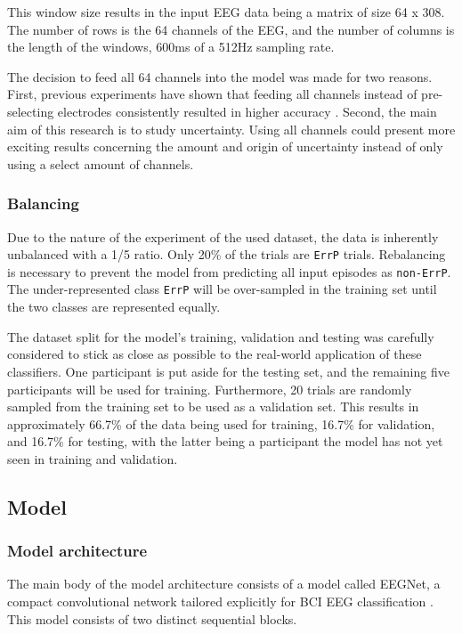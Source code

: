 This window size results in the input EEG data being a matrix of size 64 x 308. The number of rows is the 64 channels of the EEG, and the number of columns is the length of the windows, 600ms of a 512Hz sampling rate.

The decision to feed all 64 channels into the model was made for two reasons. First, previous experiments have shown that feeding all channels instead of pre-selecting electrodes consistently resulted in higher accuracy \citep{correia2021error}. Second, the main aim of this research is to study uncertainty. Using all channels could present more exciting results concerning the amount and origin of uncertainty instead of only using a select amount of channels.

\subsubsection{Balancing}

Due to the nature of the experiment of the used dataset, the data is inherently unbalanced with a 1/5 ratio. Only 20\% of the trials are \verb|ErrP| trials. Rebalancing is necessary to prevent the model from predicting all input episodes as \verb|non-ErrP|. The under-represented class \verb|ErrP| will be over-sampled in the training set until the two classes are represented equally.

The dataset split for the model's training, validation and testing was carefully considered to stick as close as possible to the real-world application of these classifiers. One participant is put aside for the testing set, and the remaining five participants will be used for training. Furthermore, 20 trials are randomly sampled from the training set to be used as a validation set. This results in approximately 66.7\% of the data being used for training, 16.7\% for validation, and 16.7\% for testing, with the latter being a participant the model has not yet seen in training and validation. 


\subsection{Model}

\subsubsection{Model architecture}

The main body of the model architecture consists of a model called EEGNet, a compact convolutional network tailored explicitly for BCI EEG classification \citep{lawhern2018eegnet}. This model consists of two distinct sequential blocks. 

